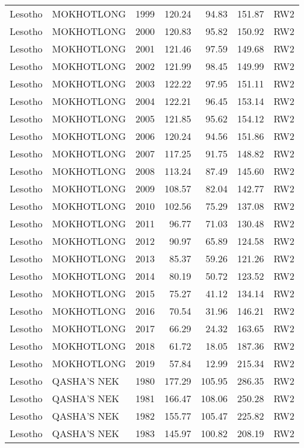 \begin{longtable}{lllrrrl}
  Lesotho & MOKHOTLONG & 1999 & 120.24 & 94.83 & 151.87 & RW2 \\ 
  Lesotho & MOKHOTLONG & 2000 & 120.83 & 95.82 & 150.92 & RW2 \\ 
  Lesotho & MOKHOTLONG & 2001 & 121.46 & 97.59 & 149.68 & RW2 \\ 
  Lesotho & MOKHOTLONG & 2002 & 121.99 & 98.45 & 149.99 & RW2 \\ 
  Lesotho & MOKHOTLONG & 2003 & 122.22 & 97.95 & 151.11 & RW2 \\ 
  Lesotho & MOKHOTLONG & 2004 & 122.21 & 96.45 & 153.14 & RW2 \\ 
  Lesotho & MOKHOTLONG & 2005 & 121.85 & 95.62 & 154.12 & RW2 \\ 
  Lesotho & MOKHOTLONG & 2006 & 120.24 & 94.56 & 151.86 & RW2 \\ 
  Lesotho & MOKHOTLONG & 2007 & 117.25 & 91.75 & 148.82 & RW2 \\ 
  Lesotho & MOKHOTLONG & 2008 & 113.24 & 87.49 & 145.60 & RW2 \\ 
  Lesotho & MOKHOTLONG & 2009 & 108.57 & 82.04 & 142.77 & RW2 \\ 
  Lesotho & MOKHOTLONG & 2010 & 102.56 & 75.29 & 137.08 & RW2 \\ 
  Lesotho & MOKHOTLONG & 2011 & 96.77 & 71.03 & 130.48 & RW2 \\ 
  Lesotho & MOKHOTLONG & 2012 & 90.97 & 65.89 & 124.58 & RW2 \\ 
  Lesotho & MOKHOTLONG & 2013 & 85.37 & 59.26 & 121.26 & RW2 \\ 
  Lesotho & MOKHOTLONG & 2014 & 80.19 & 50.72 & 123.52 & RW2 \\ 
  Lesotho & MOKHOTLONG & 2015 & 75.27 & 41.12 & 134.14 & RW2 \\ 
  Lesotho & MOKHOTLONG & 2016 & 70.54 & 31.96 & 146.21 & RW2 \\ 
  Lesotho & MOKHOTLONG & 2017 & 66.29 & 24.32 & 163.65 & RW2 \\ 
  Lesotho & MOKHOTLONG & 2018 & 61.72 & 18.05 & 187.36 & RW2 \\ 
  Lesotho & MOKHOTLONG & 2019 & 57.84 & 12.99 & 215.34 & RW2 \\ 
  Lesotho & QASHA'S NEK & 1980 & 177.29 & 105.95 & 286.35 & RW2 \\ 
  Lesotho & QASHA'S NEK & 1981 & 166.47 & 108.06 & 250.28 & RW2 \\ 
  Lesotho & QASHA'S NEK & 1982 & 155.77 & 105.47 & 225.82 & RW2 \\ 
  Lesotho & QASHA'S NEK & 1983 & 145.97 & 100.82 & 208.19 & RW2 \\ 

\end{longtable}

